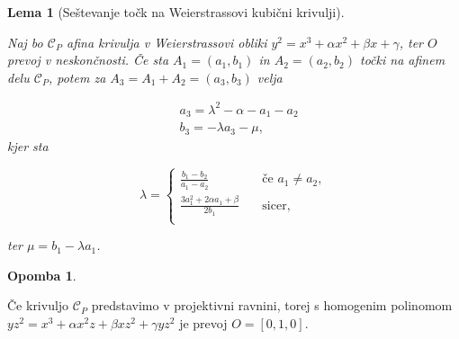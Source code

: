 \documentclass[12pt,a4paper,twoside]{article}
\theoremstyle{definition} %
\newtheorem{opomba}[definicija]{Opomba}
\theoremstyle{plain} %
\newtheorem{lema}[definicija]{Lema}
\numberwithin{equation}{section}  %
\begin{document}
\begin{lema}[Seštevanje točk na Weierstrassovi kubični krivulji]~

\label{sestevanje}
Naj bo $\mathcal{C}_P$ afina krivulja v Weierstrassovi obliki $y^2 = x^3 + \alpha x^2 + \beta x + \gamma$, ter $O$ prevoj v neskončnosti. Če sta $A_1 = (a_1,b_1)$ in $A_2 = (a_2,b_2)$ točki na afinem delu $\mathcal{C}_P$, potem za $A_3 = A_1 + A_2 = (a_3,b_3)$ velja

\begin{align}
&{} a_3 = \lambda ^2 - \alpha - a_1 - a_2 \nonumber \\
&{} b_3 = -\lambda a_3 - \mu, \nonumber
\end{align}
kjer sta 

\[ \lambda =
\begin{cases}
\frac{b_1 - b_2}{a_1 - a_2} & \quad \text{če } a_1 \neq a_2 ,\\
\frac{3a_1^2+ 2 \alpha a_1 + \beta}{2b_1} & \quad \text{sicer} ,\\
\end{cases}
\]

ter $\mu = b_1 - \lambda a_1$.

%

\end{lema}


\begin{opomba}~

Če krivuljo $\mathcal{C}_P$ predstavimo v projektivni ravnini, torej s homogenim polinomom $yz^2=x^3+\alpha x^2z+\beta xz^2+ \gamma yz^2$ je prevoj $O=[0,1,0].$
\end{opomba}
\end{document}
